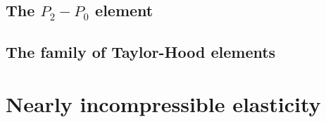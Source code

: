 \subsection{The $P_2-P_0$ element}

\subsection{The family of Taylor-Hood elements}

\section{Nearly incompressible elasticity}

